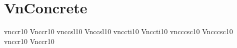 \documentclass[sample]{vnsample}
\begin{document}
\section{VnConcrete}
   {vnccr10}   {Vnccr10}
  {vnccsl10}  {Vnccsl10}
  {vnccti10}  {Vnccti10}
  {vncccsc10} {Vncccsc10}
   {vnccr10}   {Vnccr10}
\end{document}
